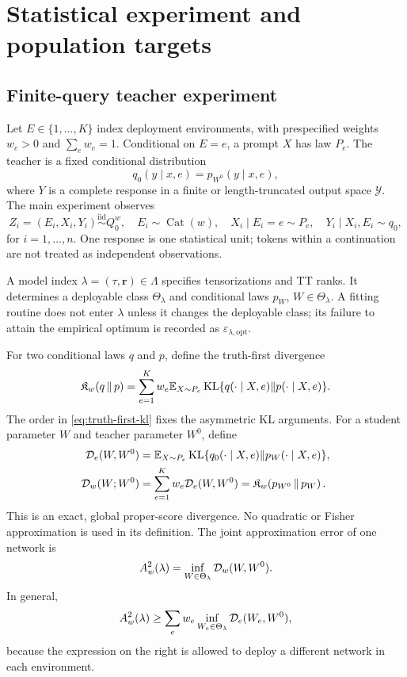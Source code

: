 \section{Statistical experiment and population targets}
\label{sec:experiment}

\subsection{Finite-query teacher experiment}

Let \(E\in\{1,\ldots,K\}\) index deployment environments, with prespecified weights \(w_e>0\) and \(\sum_e w_e=1\). Conditional on \(E=e\), a prompt \(X\) has law \(P_e\). The teacher is a fixed conditional distribution
\[
q_0(y\mid x,e)=p_{W^0}(y\mid x,e),
\]
where \(Y\) is a complete response in a finite or length-truncated output space \(\mathcal Y\). The main experiment observes
\begin{equation}
 Z_i=(E_i,X_i,Y_i)\stackrel{\mathrm{iid}}\sim Q_0^w,
 \quad E_i\sim\operatorname{Cat}(w),\quad
 X_i\mid E_i=e\sim P_e,\quad
 Y_i\mid X_i,E_i\sim q_0,
 \label{eq:experiment}
\end{equation}
for \(i=1,\ldots,n\). One response is one statistical unit; tokens within a continuation are not treated as independent observations.

A model index \(\lambda=(\tau,\bm r)\in\Lambda\) specifies tensorizations and TT ranks. It determines a deployable class \(\Theta_\lambda\) and conditional laws \(p_W\), \(W\in\Theta_\lambda\). A fitting routine does not enter \(\lambda\) unless it changes the deployable class; its failure to attain the empirical optimum is recorded as \(\varepsilon_{\lambda,\mathrm{opt}}\).

For two conditional laws \(q\) and \(p\), define the truth-first divergence
\begin{equation}
 \mathfrak K_w\!\left(q\,\middle\|\,p\right)
 =\sum_{e=1}^K w_e\mathbb E_{X\sim P_e}
 \operatorname{KL}\{q(\cdot\mid X,e)\|p(\cdot\mid X,e)\}.
 \label{eq:truth-first-kl}
\end{equation}
The order in \cref{eq:truth-first-kl} fixes the asymmetric KL arguments. For a student
parameter \(W\) and teacher parameter \(W^0\), define
\begin{align}
 \mathcal D_e(W,W^0)
 &=\mathbb E_{X\sim P_e}\operatorname{KL}\{q_0(\cdot\mid X,e)\|p_W(\cdot\mid X,e)\},\\
 \mathcal D_w(W;W^0)&=\sum_{e=1}^K w_e\mathcal D_e(W,W^0)
 =\mathfrak K_w\!\left(p_{W^0}\,\middle\|\,p_W\right).
 \label{eq:functional-risk}
\end{align}
This is an exact, global proper-score divergence. No quadratic or Fisher approximation is used in its definition. The joint approximation error of one network is
\begin{equation}
 A_w^2(\lambda)=\inf_{W\in\Theta_\lambda}\mathcal D_w(W,W^0).
 \label{eq:joint-approx}
\end{equation}
In general,
\[
A_w^2(\lambda)\ge
\sum_e w_e\inf_{W_e\in\Theta_\lambda}\mathcal D_e(W_e,W^0),
\]
because the expression on the right is allowed to deploy a different network in each environment.

